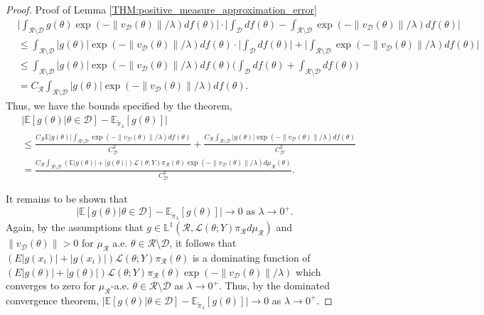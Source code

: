 \documentclass[10pt,fleqn]{article}
\newcommand{\bb}[1]{\mathbb{#1}} \newcommand{\mc}[1]{\mathcal{#1}}
\DeclareMathOperator{\1}{\mathbbm{1}} \DeclareMathOperator{\bigO}{\mc O}
\begin{document}
\begin{proof}{Proof of Lemma \ref{THM:positive_measure_approximation_error}}
\begin{align*}
&\bigg| \int_{\mathcal{R}\setminus \mathcal{D}} g(\theta) \exp(-\|v_{\mc D}(\theta)\|/\lambda )df(\theta) \bigg| \cdot \bigg|\int_\mathcal{D} df(\theta) - \int_{\mathcal{R}\setminus \mathcal{D}} \exp(-\|v_{\mc D}(\theta)\|/\lambda ) df(\theta)  \bigg| \\
& \le \int_{\mathcal{R}\setminus \mathcal{D}} |g(\theta)| \exp(-\|v_{\mc D}(\theta)\|/\lambda ) df(\theta)  \cdot \bigg|\int_\mathcal{D} df(\theta) \bigg| + \bigg| \int_{\mathcal{R}\setminus \mathcal{D}}  \exp(-\|v_{\mc D}(\theta)\|/\lambda ) df(\theta) \bigg| \\
&\le  \int_{\mathcal{R}\setminus \mathcal{D}} |g(\theta)| \exp(-\|v_{\mc D}(\theta)\|/\lambda ) df(\theta) \bigg(\int_\mathcal{D} df(\theta) +  \int_{\mathcal{R}\setminus \mathcal{D}}  df(\theta)\bigg)  \\
& = C_\mathcal{R}\int_{\mathcal{R}\setminus \mathcal{D}} |g(\theta)| \exp(-\|v_{\mc D}(\theta)\|/\lambda ) df(\theta).
\end{align*}
Thus, we have the bounds specified by the theorem,
\begin{align*}
&\big| \bb E[g(\theta)|\theta\in\mathcal{D}]-\bb E_{\tilde{\pi}_\lambda}[g(\theta)]\big| \\
& \le \frac{C_\mathcal{R}\bb E|g(\theta)| \int_{\mathcal{R}\setminus \mathcal{D}}\exp(-\|v_{\mc D}(\theta)\|/\lambda ) df(\theta)}{C_\mathcal{D}^2 } + \frac{C_\mathcal{R}\int_{\mathcal{R}\setminus \mathcal{D}} |g(\theta)|\exp(-\|v_{\mc D}(\theta)\|/\lambda ) df(\theta)}{C_\mathcal{D}^2 } \\
&= \frac{C_\mathcal{R}\int_{\mathcal{R}\setminus \mathcal{D}} (\bb E|g(\theta)|+|g(\theta)|) \mathcal{L}(\theta;Y)\pi_\mathcal{R}(\theta)\exp(-\|v_{\mc D}(\theta)\|/\lambda ) d\mu_\mathcal{R}(\theta)}{C_\mathcal{D}^2 }.
\end{align*}

It remains to be shown that $$\big| \bb E[g(\theta)|\theta\in\mathcal{D}]-\bb E_{\tilde{\pi}_\lambda}[g(\theta)]\big| \to 0 \text{ as }\lambda\to0^+.$$
Again, by the assumptions that $g\in\mathbb{L}^1(\mathcal{R},\mathcal{L}(\theta;Y)\pi_\mathcal{R}d\mu_\mathcal{R})$ and $\|v_{\mc D}(\theta)\| >0$ for $\mu_\mathcal{R}$ a.e.  $\theta \in \mathcal{R}\setminus \mathcal{D}$, it follows that $( E|g(x_i)|+|g(x_i)|) \mathcal{L}(\theta;Y)\pi_\mathcal{R}(\theta)$ is a dominating function of $( E|g(\theta)|+|g(\theta)|) \mathcal{L}(\theta;Y)\pi_\mathcal{R}(\theta)\exp(-\|v_{\mc D}(\theta)\|/\lambda )$ which converges to zero for $\mu_\mathcal{R}$-a.e. $\theta\in\mathcal{R}\setminus\mathcal{D}$ as $\lambda\to 0^+.$ Thus, by the dominated convergence theorem, $\big| \bb E[g(\theta)|\theta\in\mathcal{D}]-\bb E_{\tilde{\pi}_\lambda}[g(\theta)]\big|\to 0$ as $\lambda\to0^+.$

\end{proof}
\end{document}
